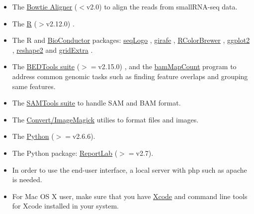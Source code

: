 \documentclass[12pt]{article}
\begin{document}
\begin{itemize}
 \item The \href{http://bowtie-bio.sourceforge.net/manual.shtml}{ Bowtie Aligner} ($<$v2.0) \cite{Langmead2009} to align the reads from smallRNA-seq data.

 \item The \href{http://www.r-project.org/}{ R} ($>$v2.12.0) \cite{Rcitation}.

 \item The R and \href{http://www.bioconductor.org/}{ BioConductor} \cite{Robert2004} packages:  \href{http://www.bioconductor.org/packages/2.2/bioc/html/seqLogo.html}{ seqLogo} \cite{OliverseqLogo}, \href{http://www.bioconductor.org/packages/2.6/bioc/html/girafe.html}{ girafe} \cite{Joern2010},  \href{http://cran.r-project.org/web/packages/RColorBrewer/index.html}{ RColorBrewer} \cite{Erich2011}, \href{http://ggplot2.org/}{ ggplot2} \cite{Wickham2009}, \href{http://cran.r-project.org/web/packages/reshape2/index.html}{ reshape2} \cite{Wickham2007} and \href{http://cran.r-project.org/web/packages/gridExtra/}{ gridExtra} \cite{Auguie2012}.

 \item The \href{http://code.google.com/p/bedtools/}{ BEDTools suite}  ($>=$v2.15.0) \cite{Quinlan2010}, and the \href{
http://xfer.curie.fr/get/nil/2Rpz9IfJKcZ/BEDTools_MapCount_ColorTag.tar.gz }{ bamMapCount} program  to address common genomic tasks such as finding feature overlaps and grouping same features.

 \item The \href{http://samtools.sourceforge.net/}{ SAMTools suite} \cite{Li2009} to handle SAM and BAM format.

 \item The \href{http://www.imagemagick.org/script/index.php}{ Convert/ImageMagick} utilies to format files and images.

 \item The \href{https://www.python.org/}{ Python} ($>=$v2.6.6).

 \item The Python package: \href{http://www.reportlab.com/opensource/}{ ReportLab} ($>=$v2.7).

 \item In order to use the end-user interface, a local server with php such as apache is needed.

 \item For Mac OS X user, make sure that you have \href{http://developer.apple.com/xcode/}{ Xcode} and command line tools for Xcode installed in your system.
\end{itemize}
\end{document}
